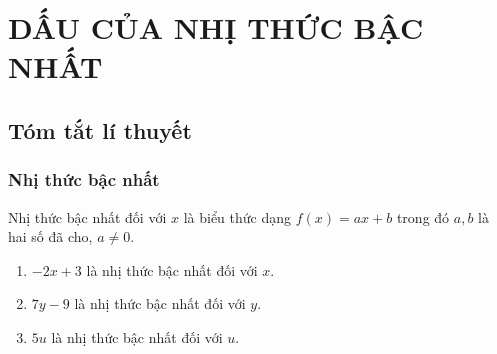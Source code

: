 \section{DẤU CỦA NHỊ THỨC BẬC NHẤT}
\subsection{Tóm tắt lí thuyết}
\subsubsection{Nhị thức bậc nhất}
\begin{dn}
Nhị thức bậc nhất đối với $x$ là biểu thức dạng $f(x)=ax+b$ trong đó $a,b$ là hai số đã cho, $a\ne 0$.
\end{dn}

\begin{vd}%
\begin{enumerate}
\item $-2x+3$ là nhị thức bậc nhất đối với $x$.
\item $7y-9$ là nhị thức bậc nhất đối với $y$.
\item $5u$ là nhị thức bậc nhất đối với $u$.
\end{enumerate}
\end{vd}

